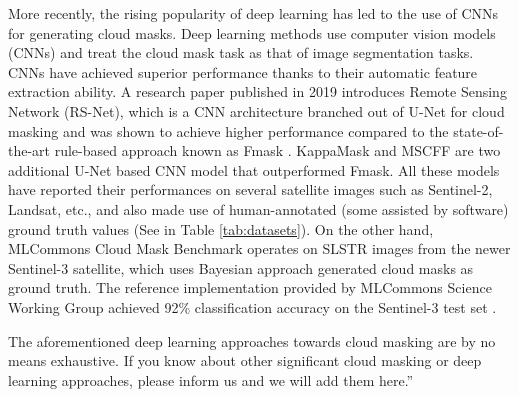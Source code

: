 \documentclass[sigplan,screen]{acmart}
\begin{document}
More recently, the rising popularity of deep learning has led to the use of CNNs for generating cloud masks. Deep learning methods \cite{Li2019DeepLB,Domnich2021KappaMaskAC,Yan2018CloudAC,WIELAND2019111203,JEPPESEN2019247} use computer vision models (CNNs) and treat the cloud mask task as that of image segmentation tasks. CNNs have achieved superior performance thanks to their automatic feature extraction ability. A research paper published in 2019 \cite{JEPPESEN2019247} introduces Remote Sensing Network (RS-Net), which is a CNN architecture branched out of U-Net \cite{RFB15a} for cloud masking and was shown to achieve higher performance compared to the state-of-the-art rule-based approach known as Fmask \cite{Zhu2012ObjectbasedCA}. KappaMask \cite{Domnich2021KappaMaskAC} and MSCFF \cite{Li2019DeepLB} are two additional U-Net based CNN model that outperformed Fmask. All these models have reported their performances on several satellite images such as Sentinel-2, Landsat, etc., and also made use of human-annotated (some assisted by software) ground truth values (See in Table \ref{tab:datasets}). On the other hand, MLCommons Cloud Mask Benchmark operates on SLSTR images from the newer Sentinel-3 satellite, which uses Bayesian approach generated cloud masks as ground truth. The reference implementation provided by MLCommons Science Working Group achieved 92\% classification accuracy on the Sentinel-3 test set \cite{Thiyagalingam2022AIBF}.

The aforementioned deep learning approaches towards cloud masking are by no means exhaustive. If you know about other significant cloud masking or deep learning approaches, please inform us and we will add them here.''
\end{document}
